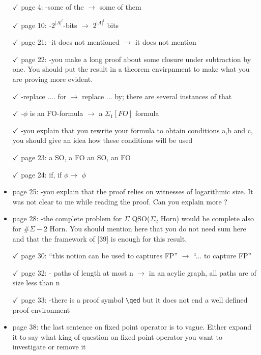 \documentclass[a4paper]{article}
\begin{document}
\begin{itemize}
\item[$\checkmark$] page 4:
-some of the $\to$ some of them 
\item[$\checkmark$] page 10: 
-$2^{|A|^l}$-bits $\to$ $2^{|A|^l}$ bits
\item[$\checkmark$] page 21:
-it does not mentioned $\to$ it does not mention
\item[$\checkmark$] page 22: 
-you make a long proof about some closure under subtraction by one.
You should put the result in a theorem envirpnment to make what you are
proving more evident.
\item[$\checkmark$] -replace .... for $\to$ replace ... by;  there are several instances of
that
\item[$\checkmark$] -$\phi$ is an FO-formula $\to$ a $\Sigma_1[FO]$ formula
\item[$\checkmark$] -you explain that you rewrite your formula to obtain conditions a,b and c, 
you should give an idea how these conditions will be used
\item[$\checkmark$] page 23:
a SO, a FO  an SO, an FO
\item[$\checkmark$] page 24: 
if, if $\phi$$\to$ $\phi$
\item page 25: 
-you explain that the proof relies on witnesses of logarithmic size.
It was not clear to me while reading the proof. Can you explain more ?
\item page 28:
-the complete problem for $\Sigma$ QSO($\Sigma_2$ Horn) would be complete also for $\#\Sigma-2$ Horn. You should mention here that you do not need sum here
and that the framework of [39] is enough for this result.
\item[$\checkmark$] page 30: ``this notion can be used to captures FP'' $\to$ ``... to capture FP''

\item[$\checkmark$] page 32: 
- paths of length at most n $\to$ in an acylic graph, all paths are of size less than n
\item[$\checkmark$] page 33:
-there is a proof symbol \verb|\qed| but it does not end a well defined proof environment

\item page 38: 
the last sentence on fixed point operator is to vague. Either expand it to 
say what king of question on fixed point operator you want to investigate or remove it	
\end{itemize}



	
\end{document}
